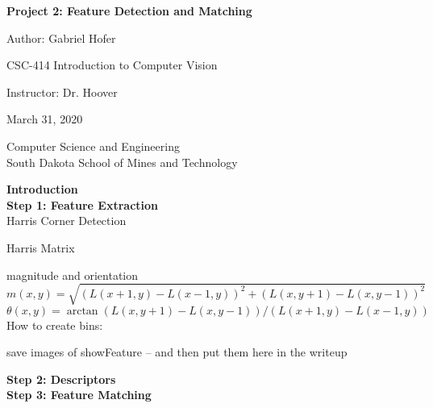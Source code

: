 \documentclass[12pt]{article}
\begin{document}
\begin{titlepage}
   \begin{center}
       \vspace*{1cm}
       \large
       \textbf{Project 2: Feature Detection and Matching}
       \normalsize

       \vspace{0.5cm}

       Author: Gabriel Hofer

       \vspace{0.5cm}

       CSC-414 Introduction to Computer Vision

       \vspace{0.5cm}

       Instructor: Dr. Hoover

       \vspace{0.5cm}

        March 31, 2020

       \vfill

       Computer Science and Engineering\\
       South Dakota School of Mines and Technology\\
   \end{center}
\end{titlepage}
\newpage



\small
\textbf{Introduction}\\ 



\textbf{Step 1: Feature Extraction}\\ 
Harris Corner Detection



Harris Matrix



magnitude and orientation
\[
    m(x,y) = \sqrt{(L(x+1,y)-L(x-1,y))^2+(L(x,y+1)-L(x,y-1))^2}
\]
\[
    \theta (x,y) = \arctan{(L(x,y+1)-L(x,y-1))/(L(x+1,y)-L(x-1,y))}
\]
How to create bins:

save images of showFeature -- and then put them here in the writeup

\textbf{Step 2: Descriptors}\\

\textbf{Step 3: Feature Matching}\\
\end{document}
